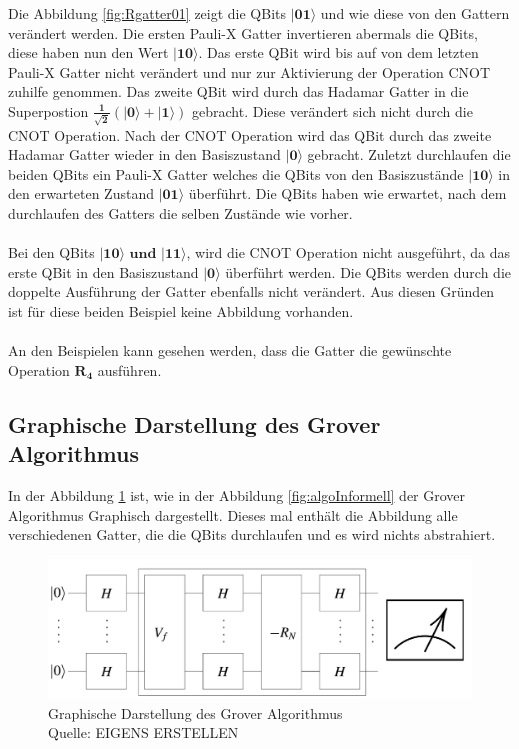 \noindent
 Die Abbildung \ref{fig:Rgatter01} zeigt die QBits $\mathbf{|01\rangle}$  und wie diese von den Gattern verändert werden. Die ersten Pauli-X Gatter invertieren abermals die QBits, diese haben nun den Wert $\mathbf{|10\rangle}$. Das erste QBit wird bis auf von dem letzten Pauli-X Gatter nicht verändert und nur zur Aktivierung der Operation CNOT zuhilfe genommen. Das zweite QBit wird durch das Hadamar Gatter in die Superpostion $\mathbf{\frac{1}{\sqrt 2}(|0\rangle + |1\rangle)}$ gebracht. Diese verändert sich nicht durch die CNOT Operation. Nach der CNOT Operation wird das QBit durch das zweite Hadamar Gatter wieder in den Basiszustand $\mathbf{|0\rangle}$ gebracht. Zuletzt durchlaufen die beiden QBits ein Pauli-X Gatter welches die QBits von den Basiszustände $\mathbf{|10\rangle}$ in den erwarteten Zustand $\mathbf{|01\rangle}$ überführt. Die QBits haben wie erwartet, nach dem durchlaufen des Gatters die selben Zustände wie vorher.
  \\ 
  \\
Bei den QBits $\mathbf{|10\rangle \text{ und }|11\rangle}$, wird die CNOT Operation nicht ausgeführt, da das erste QBit in den Basiszustand $\mathbf{|0\rangle}$ überführt werden. Die QBits werden durch die doppelte Ausführung der Gatter ebenfalls nicht verändert. Aus diesen Gründen ist für diese beiden Beispiel keine Abbildung vorhanden.
\\
\\
An den Beispielen kann gesehen werden, dass die Gatter die gewünschte Operation $\mathbf{R_4}$ ausführen.

\subsection{Graphische Darstellung des Grover Algorithmus}
In der Abbildung \ref{fig:algoFormell} ist, wie in der Abbildung \ref{fig:algoInformell} der Grover Algorithmus Graphisch dargestellt. Dieses mal enthält die Abbildung alle verschiedenen Gatter, die die QBits durchlaufen und es wird nichts abstrahiert.
\begin{figure}[hbtp]
	\centering
	\includegraphics[width=1\textwidth]{figures/algoFormell.png}
	\caption{Graphische Darstellung des Grover Algorithmus \\ Quelle: EIGENS ERSTELLEN }
	\label{fig:algoFormell}
\end{figure}



